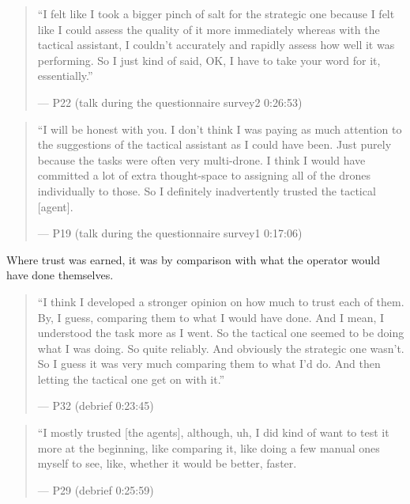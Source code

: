\begin{quote}\small
``I felt like I took a bigger pinch of salt for the strategic one because I felt like I could assess the quality of it more immediately whereas with the tactical assistant, I couldn't accurately and rapidly assess how well it was performing. So I just kind of said, OK, I have to take your word for it, essentially.''\par\hfill--- P22 (talk during the questionnaire survey2 0:26:53)
\end{quote}

\begin{quote}\small
``I will be honest with you. I don't think I was paying as much attention to the suggestions of the tactical assistant as I could have been. Just purely because the tasks were often very multi-drone. I think I would have committed a lot of extra thought-space to assigning all of the drones individually to those. So I definitely inadvertently trusted the tactical [agent].\par\hfill--- P19 (talk during the questionnaire survey1 0:17:06)
\end{quote}


\label{sec:qual:trust-unchecked:earned}
Where trust was earned, it was by comparison with what the operator would have done themselves.

\begin{quote}\small
``I think I developed a stronger opinion on how much to trust each of them. By, I guess, comparing them to what I would have done. And I mean, I understood the task more as I went. So the tactical one seemed to be doing what I was doing. So quite reliably. And obviously the strategic one wasn't. So I guess it was very much comparing them to what I'd do. And then letting the tactical one get on with it.''\par\hfill--- P32 (debrief 0:23:45)
\end{quote}

\begin{quote}\small
``I mostly trusted [the agents], although, uh, I did kind of want to test it more at the beginning, like comparing it, like doing a few manual ones myself to see, like, whether it would be better, faster.\par\hfill--- P29 (debrief 0:25:59)
\end{quote}

\clearpage

